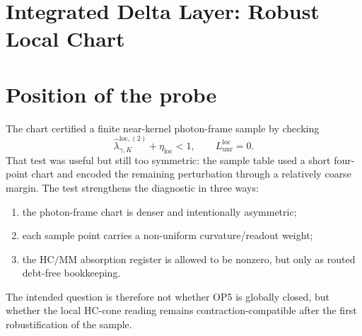 \providecommand{\safeop}[1]{\mathsf{#1}}
\clearpage
\section*{Integrated Delta Layer: Robust Local Chart}
\providecommand{\HC}{}
\renewcommand{\HC}{\mathrm{HC}}
\providecommand{\MM}{}
\renewcommand{\MM}{\mathrm{MM}}
\providecommand{\OP}{}
\renewcommand{\OP}{\mathrm{OP}}
\providecommand{\rout}{}
\renewcommand{\rout}{\mathrm{rout}}
\providecommand{\unr}{}
\renewcommand{\unr}{\mathrm{unr}}
\providecommand{\near}{}
\renewcommand{\near}{\mathrm{near}}
\providecommand{\asym}{}
\renewcommand{\asym}{\mathrm{asym}}
\providecommand{\certred}{}
\renewcommand{\certred}{\mathrm{cert\_red}_{\gamma,\asym}}
\providecommand{\closecand}{}
\renewcommand{\closecand}{\mathrm{close\_cand}_{\gamma,\asym}}
\providecommand{\resproj}{}
\renewcommand{\resproj}{\mathrm{res\_proj}_{\gamma,\asym}}
\providecommand{\compmargin}{}
\renewcommand{\compmargin}{\mathrm{comp\_margin}_{\gamma,\asym}}
\providecommand{\debtrout}{}
\renewcommand{\debtrout}{\mathrm{debt\_rout}_{\gamma,\asym}}



\begin{abstract}
This delta layer continues the local proof chain photon-frame \(\HC\)-collar contraction line. The idealized non-ideal sample already produced a local photon-frame near-kernel closure candidate. The present layer tests whether that candidate survives a denser asymmetric chart, non-uniform curvature/readout weights, and explicitly nonzero routed \(\HC/\MM\) absorption. The result is still conservative: it is a local OP5 closure-candidate certificate for the declared chart only, not a global OP5 closure theorem.
\end{abstract}

\section{Position of the probe}

The chart certified a finite near-kernel photon-frame sample by checking
\[
 \widehat\lambda_{\gamma,K}^{\mathrm{loc},(2)}+\eta_{\mathrm{loc}}<1,
 \qquad L_{\unr}^{\mathrm{loc}}=0.
\]
That test was useful but still too symmetric: the sample table used a short four-point chart and encoded the remaining perturbation through a relatively coarse margin. The test strengthens the diagnostic in three ways:
\begin{enumerate}
 \item the photon-frame chart is denser and intentionally asymmetric;
 \item each sample point carries a non-uniform curvature/readout weight;
 \item the \(\HC/\MM\) absorption register is allowed to be nonzero, but only as routed debt-free bookkeeping.
\end{enumerate}
The intended question is therefore not whether OP5 is globally closed, but whether the local \(\HC\)-cone reading remains contraction-compatible after the first robustification of the sample.

